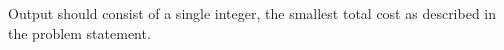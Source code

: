 Output should consist of a single integer, the smallest total cost as described in the problem statement.